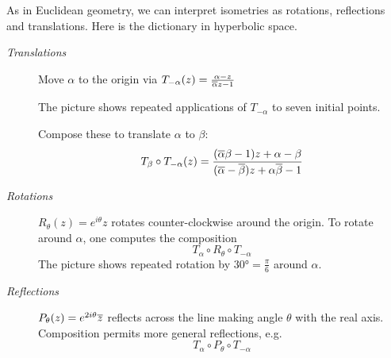 
As in Euclidean geometry, we can interpret isometries as rotations, reflections and translations. Here is the dictionary in hyperbolic space.\par

\begin{minipage}[t]{0.75\linewidth}\vspace{-3pt}
\begin{description}
\item[\normalfont\emph{Translations}] Move $\alpha$ to the origin via $T_{-\alpha}(z)=\frac{\alpha-z}{\overline{\alpha} z-1}$\par
The picture shows repeated applications of $T_{-\alpha}$ to seven initial points.\par
Compose these to translate $\alpha$ to $\beta$:
\[T_{\beta}\circ T_{-\alpha}(z)=\frac{(\overline{\alpha}\beta-1)z+\alpha-\beta}{(\overline{\alpha}-\overline{\beta})z+\alpha\overline{\beta}-1}\]

\item[\normalfont\emph{Rotations}] $R_\theta(z)=e^{i\theta}z$ rotates counter-clockwise around the origin. To rotate around $\alpha$, one computes the composition
	\[T_{\alpha}\circ R_\theta\circ T_{-\alpha}\]
	The picture shows repeated rotation by $\ang{30}=\frac\pi 6$ around $\alpha$.

\item[\normalfont\emph{Reflections}] $P_\theta(z)=e^{2i\theta}\overline{z}$ reflects across the line making angle $\theta$ with the real axis. Composition permits more general reflections, e.g.
	\[T_{\alpha}\circ P_\theta\circ T_{-\alpha}\]
\end{description}
\end{minipage}\hfill
